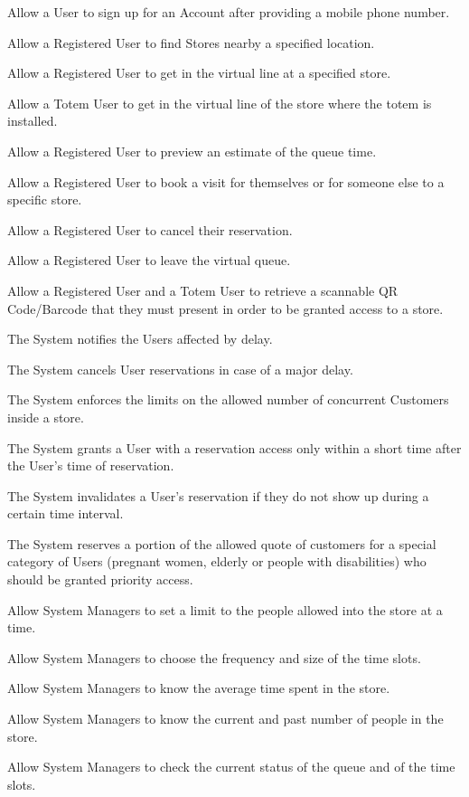 \begin{enumerate}[label={[R\arabic*]}]
    \item Allow a User to sign up for an Account after providing a mobile phone number.
    \item Allow a Registered User to find Stores nearby a specified location.
    \item Allow a Registered User to get in the virtual line at a specified store.
    \item Allow a Totem User to get in the virtual line of the store where the totem is installed.
    \item Allow a Registered User to preview an estimate of the queue time.
    \item Allow a Registered User to book a visit for themselves or for someone else to a specific store.
    \item Allow a Registered User to cancel their reservation.
    \item Allow a Registered User to leave the virtual queue.
    \item Allow a Registered User and a Totem User to retrieve a scannable QR Code/Barcode that they must present in order to be granted access to a store.

    \item The System notifies the Users affected by delay.
    \item The System cancels User reservations in case of a major delay.
    \item The System enforces the limits on the allowed number of concurrent Customers inside a store.
    \item The System grants a User with a reservation access only within a short time after the User's time of reservation.
    \item The System invalidates a User's reservation if they do not show up during a certain time interval.
    \item The System reserves a portion of the allowed quote of customers for a special category of Users (pregnant women, elderly or people with disabilities) who should be granted priority access.
    
    \item Allow System Managers to set a limit to the people allowed into the store at a time.
    \item Allow System Managers to choose the frequency and size of the time slots.
    \item Allow System Managers to know the average time spent in the store.
    \item Allow System Managers to know the current and past number of people in the store.
    \item Allow System Managers to check the current status of the queue and of the time slots.
\end{enumerate}

